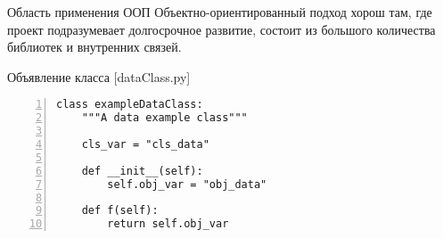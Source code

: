 \documentclass[hyperref={pdftex,unicode}]{beamer}
\begin{document}
\begin{frame}{Область применения ООП}
  Объектно-ориентированный подход хорош там, где проект подразумевает долгосрочное развитие,
  состоит из большого количества библиотек и внутренних связей.
\end{frame}


\begin{frame}[fragile]{Объявление класса [dataClass.py]}
    \begin{lstlisting}[numbers=left]
class exampleDataClass:                                                                         
    """A data example class"""
                                                         
    cls_var = "cls_data"                                                                        

    def __init__(self):                                                                         
        self.obj_var = "obj_data"   
                                                            
    def f(self):                                                                                
        return self.obj_var
    \end{lstlisting}
\end{frame}
\end{document}
